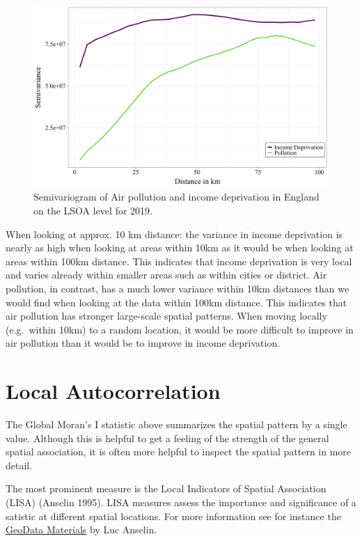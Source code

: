 \documentclass[
  letterpaper,
  DIV=11,
  numbers=noendperiod]{scrreprt}
\begin{document}
\begin{figure}

{\centering \includegraphics{fig/Semivariogram_2019.png}

}

\caption{Semivariogram of Air pollution and income deprivation in
England on the LSOA level for 2019.}

\end{figure}

When looking at approx. 10 km distance: the variance in income
deprivation is nearly as high when looking at areas within 10km as it
would be when looking at areas within 100km distance. This indicates
that income deprivation is very local and varies already within smaller
areas such as within cities or district. Air pollution, in contrast, has
a much lower variance within 10km distances than we would find when
looking at the data within 100km distance. This indicates that air
pollution has stronger large-scale spatial patterns. When moving locally
(e.g.~within 10km) to a random location, it would be more difficult to
improve in air pollution than it would be to improve in income
deprivation.

\hypertarget{local-autocorrelation}{%
\section{Local Autocorrelation}\label{local-autocorrelation}}

The Global Moran's I statistic above summarizes the spatial pattern by a
single value. Although this is helpful to get a feeling of the strength
of the general spatial association, it is often more helpful to inspect
the spatial pattern in more detail.

The most prominent measure is the Local Indicators of Spatial
Association (LISA) (Anselin 1995). LISA measures assess the importance
and significance of a satistic at different spatial locations. For more
information see for instance the
\href{https://geodacenter.github.io/workbook/6a_local_auto/lab6a.html}{GeoData
Materials} by Luc Anselin.
\end{document}
